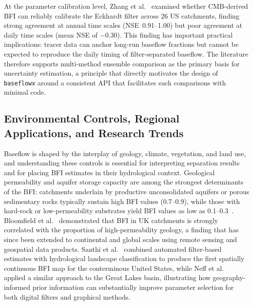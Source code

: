 \documentclass[hydrology,article,submit,pdftex,moreauthors]{Definitions/mdpi}
\begin{document}
At the parameter calibration level, Zhang et al.~\cite{Zhang2021} examined whether CMB-derived BFI can reliably calibrate the Eckhardt filter across 26 US catchments, finding strong agreement at annual time scales (NSE~0.91--1.00) but poor agreement at daily time scales (mean NSE of $-0.30$). This finding has important practical implications: tracer data can anchor long-run baseflow fractions but cannot be expected to reproduce the daily timing of filter-separated baseflow. The literature therefore supports multi-method ensemble comparison as the primary basis for uncertainty estimation, a principle that directly motivates the design of \texttt{baseflowx} around a consistent API that facilitates such comparisons with minimal code.

\subsection{Environmental Controls, Regional Applications, and Research Trends}
\label{sec:controls}

Baseflow is shaped by the interplay of geology, climate, vegetation, and land use, and understanding these controls is essential for interpreting separation results and for placing BFI estimates in their hydrological context. Geological permeability and aquifer storage capacity are among the strongest determinants of the BFI: catchments underlain by productive unconsolidated aquifers or porous sedimentary rocks typically sustain high BFI values (0.7--0.9), while those with hard-rock or low-permeability substrates yield BFI values as low as 0.1--0.3~\cite{Smakhtin2001,Tallaksen1995}. Bloomfield et al.~\cite{Bloomfield2009} demonstrated that BFI in UK catchments is strongly correlated with the proportion of high-permeability geology, a finding that has since been extended to continental and global scales using remote sensing and geospatial data products. Santhi et al.~\cite{Santhi2008} combined automated filter-based estimates with hydrological landscape classification to produce the first spatially continuous BFI map for the conterminous United States, while Neff et al.~\cite{Neff2005} applied a similar approach to the Great Lakes basin, illustrating how geography-informed prior information can substantially improve parameter selection for both digital filters and graphical methods.
\end{document}
